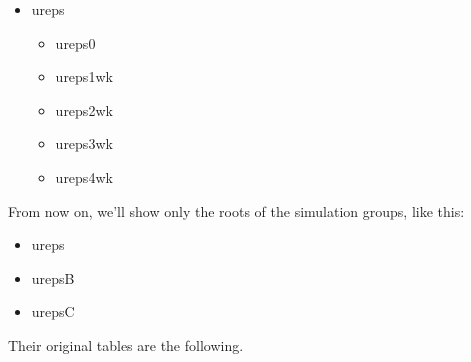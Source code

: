 \documentclass[10pt,oneside]{memoir}
\begin{document}
\begin{itemize}


\item ureps
\begin{itemize}


\item ureps0

\item ureps1wk

\item ureps2wk

\item ureps3wk

\item ureps4wk
\end{itemize}


\end{itemize}

From now on, we'll show only the roots of the simulation groups, like this:


\begin{itemize}


\item ureps

\item urepsB

\item urepsC
\end{itemize}

Their original tables are the following.
\end{document}
